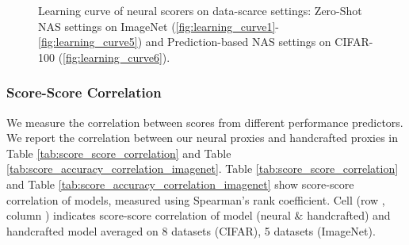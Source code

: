 \documentclass[lettersize,journal]{IEEEtran}
\begin{document}
          \begin{figure*}
            \centering
            
            \hfill
            \hfill
            
            \vspace{1cm} 

            \hfill
            \hfill
            
             \caption{Learning curve of neural scorers on data-scarce settings: Zero-Shot NAS settings on ImageNet (\ref{fig:learning_curve1}-\ref{fig:learning_curve5}) and Prediction-based NAS settings on CIFAR-100 (\ref{fig:learning_curve6}).}
            \label{fig:learning_curve}
        \end{figure*}












        \subsubsection{Score-Score Correlation}
            We measure the correlation between scores from different performance predictors. We report the correlation between our neural proxies and handcrafted proxies in Table \ref{tab:score_score_correlation} and Table \ref{tab:score_accuracy_correlation_imagenet}. Table \ref{tab:score_score_correlation} and Table \ref{tab:score_accuracy_correlation_imagenet} show score-score correlation of models, measured using Spearman's rank coefficient. Cell (row , column ) indicates score-score correlation of model (neural \& handcrafted)  and handcrafted model  averaged on 8 datasets (CIFAR), 5 datasets (ImageNet).
            
\end{document}
